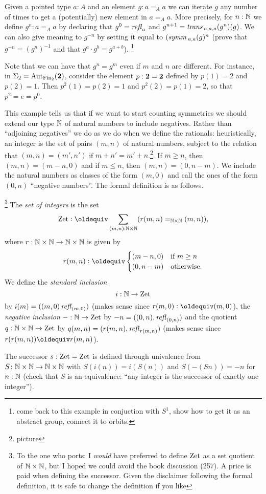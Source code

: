  \begin{example}\label{ex:orbitofanelement}
   Given a pointed type $a:A$ and an element $g: a=_Aa$ we can iterate $g$ any number of times to get a (potentially) new element in $a=_Aa$. More precisely, for $n:\mathbb{N}$ we define $g^n:a=_Aa$ by declaring that $g^0=\mathop{{\it refl}_{a}}$ and $g^{n+1}=\mathop{\mathit{trans}}{}_{a,a,a}(g^n)(g)$.  We can also give meaning to $g^{-n}$ by setting it equal to $(\mathop{\mathit{symm}}{}_{a,a}(g)^n$ (prove that $g^{-n}=(g^n)^{-1}$ and that $g^a\cdot g^b=g^{a+b}$).  \footnote{come back to this example in conjuction with $S^1$, show how to get it as an abstract group, connect it to orbits.}

Note that we can have that $g^n=g^m$ even if $m$ and $n$ are different.  For instance, in $\Sigma_2=\mathrm{Aut}_{\operatorname{Fin}_2}(\mathbf{2} )$, consider the element $p:\mathbf{2} =\mathbf{2} $ defined by $p(1)=2$ and $p(2)=1$.  Then $p^2(1)=p(2)=1$ and $p^2(2)=p(1)=2$, so that $p^2=e=p^0$.
   \end{example}
This example tells us that if we want to start counting symmetries we should extend our type $\mathbb{N}$ of natural numbers to include negatives.  Rather than ``adjoining negatives'' we do as we do when we define the rationals: heuristically, an integer is the set of pairs $(m,n)$ of natural numbers, subject to the relation that $(m,n)=(m',n')$ if $m+n'=m'+n$.\footnote{picture}.  If $m\geq n$, then $(m,n)=(m-n,0)$ and if $m\leq n$, then $(m,n)=(0,n-m)$.  We include the natural numbers as classes of the form $(m,0)$ and call the ones of the form $(0,n)$ ``negative numbers''.  The formal definition is as follows.
\begin{definition}
  \label{def:zet}\footnote{To the one who ports: I \emph{would} have preferred to define $\mathrm{Zet}$ as a set quotient of $\mathbb{N}\times\mathbb{N}$, but I hoped we could avoid the book discussion (257).  A price is paid when defining the successor.  Given the disclaimer following the formal definition, it is safe to change the definition if you like}
  The \emph{set of integers} is the set
$$\zet\defequi \sum_{(m,n):\NN\times\NN}(r(m,n)=_{\NN\times\NN}(m,n)),$$
where $r:\mathbb{N}\times\mathbb{N}\to\mathbb{N}\times\mathbb{N}$ is given by
$$r(m,n)\defequi
\begin{cases}
  (m-n,0)&\text{if $m\geq n$}\\
  (0,n-m)&\text{otherwise.}
\end{cases}
$$
We define the \emph{standard inclusion} 
$$i:\mathbb{N}\to\mathrm{Zet}$$ by $i(m)=((m,0)\mathop{{\it refl}_{(m,0)}})$ (makes sense since $r(m,0)\defequi(m,0)$), the \emph{negative inclusion} $-:\mathbb{N}\to\mathrm{Zet}$ by $-n=((0,n),\mathop{{\it refl}_{(0,n)}})$ and the quotient $q:\mathbb{N}\times\mathbb{N}\to\mathrm{Zet}$ by $q(m,n)=(r(m,n),\mathop{{\it refl}_{r(m,n)}})$ (makes sense since $r(r(m,n))\oldequiv r(m,n)$).  

The successor $s:\mathrm{Zet}=\mathrm{Zet}$ is defined through univalence from $S\colon\mathbb{N}\times\mathbb{N}\to\mathbb{N}\times\mathbb{N}$ with $S(i(n))=i(S(n))$  and $S(-(Sn))=-n$ for $n:\mathbb{N}$ (check that $S$ is an equivalence: ``any integer is the successor of exactly one integer'').
\end{definition}


